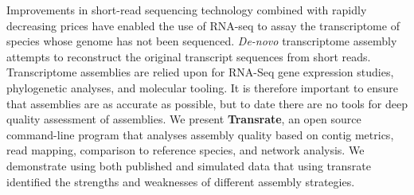 Improvements in short-read sequencing technology combined with rapidly decreasing prices have enabled the use of RNA-seq to assay the transcriptome of species whose genome has not been sequenced. {\it De-novo} transcriptome assembly attempts to reconstruct the original transcript sequences from short reads. Transcriptome assemblies are relied upon for RNA-Seq gene expression studies, phylogenetic analyses, and molecular tooling. It is therefore important to ensure that assemblies are as accurate as possible, but to date there are no tools for deep quality assessment of assemblies. We present \textbf{Transrate}, an open source command-line program that analyses assembly quality based on contig metrics, read mapping, comparison to reference species, and network analysis. We demonstrate using both published and simulated data that using transrate identified the strengths and weaknesses of different assembly strategies.